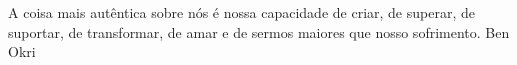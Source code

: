 

\begin{epigrafe}
	\vspace*{\fill}
	\begingroup
	\OnehalfSpacing
	\leftskip=4cm
	\noindent%
	A coisa mais autêntica sobre nós é nossa capacidade de criar, de superar, de suportar, de transformar, de amar e de sermos maiores que nosso sofrimento.
	  \flushright
	  Ben Okri
	\par
	\endgroup
\end{epigrafe}